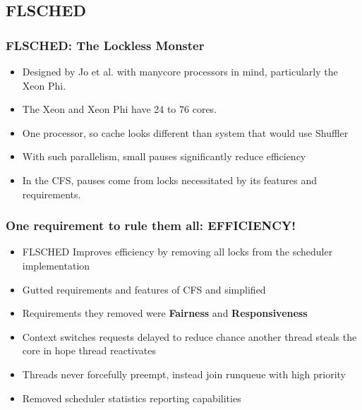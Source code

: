 \documentclass{beamer}
\newcommand{\linespace}{\vskip 0.25cm}
\begin{document}
\subsection{FLSCHED}
\begin{frame}
\frametitle{FLSCHED: The Lockless Monster}

\begin{itemize}
	\item Designed by Jo et al. with manycore processors in mind, particularly the Xeon Phi.


\linespace

\item The Xeon and Xeon Phi have 24 to 76 cores.
\linespace
\item One processor, so cache looks different than system that would use Shuffler
\linespace
\item With such parallelism, small pauses significantly reduce efficiency
\linespace

\item In the CFS, pauses come from locks necessitated by its features and requirements.

\end{itemize}
\end{frame}

\begin{frame}
\frametitle{One requirement to rule them all: EFFICIENCY!}

\begin{itemize}
\item FLSCHED Improves efficiency by removing all locks from the scheduler implementation

\item Gutted requirements and features of CFS and simplified
\linespace

\item Requirements they removed were \textbf{Fairness} and \textbf{Responsiveness}

\item Context switches requests delayed to reduce chance another thread steals the core in hope thread reactivates

\item Threads never forcefully preempt, instead join runqueue with high priority

\item Removed scheduler statistics reporting capabilities

\end{itemize}
\end{frame}
\end{document}
